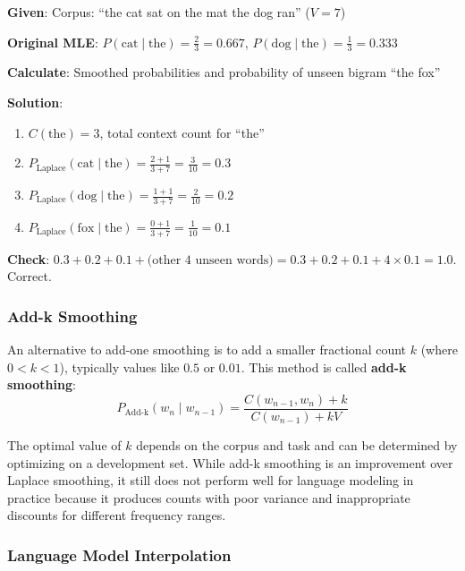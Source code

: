 \documentclass[11pt,a4paper]{article}
\begin{document}
\begin{tcolorbox}[colback=green!5!white,colframe=green!75!black,title=\textbf{Worked Example 10: Laplace Smoothing on Unseen Bigrams}]
\textbf{Given}: Corpus: ``the cat sat on the mat the dog ran'' ($V = 7$)

\textbf{Original MLE}: $P(\text{cat} \mid \text{the}) = \frac{2}{3} = 0.667$, $P(\text{dog} \mid \text{the}) = \frac{1}{3} = 0.333$

\textbf{Calculate}: Smoothed probabilities and probability of unseen bigram ``the fox''

\textbf{Solution}:
\begin{enumerate}
    \item $C(\text{the}) = 3$, total context count for ``the''
    \item $P_{\text{Laplace}}(\text{cat} \mid \text{the}) = \frac{2+1}{3+7} = \frac{3}{10} = 0.3$
    \item $P_{\text{Laplace}}(\text{dog} \mid \text{the}) = \frac{1+1}{3+7} = \frac{2}{10} = 0.2$
    \item $P_{\text{Laplace}}(\text{fox} \mid \text{the}) = \frac{0+1}{3+7} = \frac{1}{10} = 0.1$
\end{enumerate}

\textbf{Check}: $0.3 + 0.2 + 0.1 + \text{(other 4 unseen words)} = 0.3 + 0.2 + 0.1 + 4 \times 0.1 = 1.0$. Correct.
\end{tcolorbox}

\subsubsection{Add-k Smoothing}

An alternative to add-one smoothing is to add a smaller fractional count $k$ (where $0 < k < 1$), typically values like $0.5$ or $0.01$. This method is called \textbf{add-k smoothing}:
\[
P_{\text{Add-k}}(w_n \mid w_{n-1}) = \frac{C(w_{n-1}, w_n) + k}{C(w_{n-1}) + kV}
\]

The optimal value of $k$ depends on the corpus and task and can be determined by optimizing on a development set. While add-k smoothing is an improvement over Laplace smoothing, it still does not perform well for language modeling in practice because it produces counts with poor variance and inappropriate discounts for different frequency ranges.

\subsubsection{Language Model Interpolation}
\end{document}
